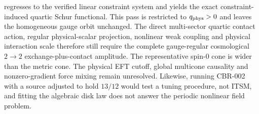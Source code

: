 regresses to the verified linear constraint system and yields the exact
constraint-induced quartic Schur functional.  This pass is restricted to
$q_{\rm phys}>0$ and leaves the homogeneous gauge orbit unchanged.  The
direct multi-sector quartic contact action, regular physical-scalar
projection, nonlinear weak coupling and physical interaction scale therefore
still require the complete gauge-regular cosmological $2\!\to\!2$
exchange-plus-contact amplitude.  The representative spin-0
cone is wider than the metric cone.  The physical EFT cutoff, global
multicone causality and nonzero-gradient force mixing remain
unresolved.
Likewise, running CBR-002 with a source adjusted to hold $13/12$ would test a
tuning procedure, not ITSM, and fitting the algebraic disk law does not answer
the periodic nonlinear field problem.
